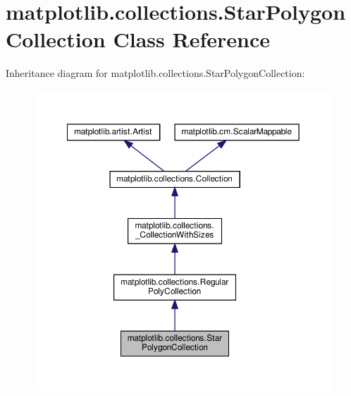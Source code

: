 \hypertarget{classmatplotlib_1_1collections_1_1StarPolygonCollection}{}\section{matplotlib.\+collections.\+Star\+Polygon\+Collection Class Reference}
\label{classmatplotlib_1_1collections_1_1StarPolygonCollection}


Inheritance diagram for matplotlib.\+collections.\+Star\+Polygon\+Collection\+:
\nopagebreak
\begin{figure}[H]
\begin{center}
\leavevmode
\includegraphics[width=350pt]{classmatplotlib_1_1collections_1_1StarPolygonCollection__inherit__graph}
\end{center}
\end{figure}


